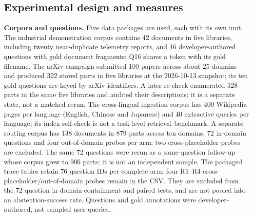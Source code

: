 \documentclass[11pt]{article}
\begin{document}
\subsection{Experimental design and measures}


\textbf{Corpora and questions.} Five data packages are used, each with its own
unit. The industrial demonstration corpus contains 42 documents in five
libraries, including twenty near-duplicate telemetry reports, and 16
developer-authored questions with gold document fragments; Q16 shares a token
with its gold filename. The arXiv campaign submitted 100 papers across about
25 domains and produced 322 stored parts in five libraries at the 2026-10-13
snapshot; its ten gold questions are keyed by arXiv identifiers. A later
re-check enumerated 328 parts in the same five libraries and audited their
descriptions; it is a separate state, not a matched rerun. The cross-lingual
ingestion corpus has 400 Wikipedia pages per language (English, Chinese and
Japanese) and 40 extractive queries per language; its index self-check is not
a task-level retrieval benchmark. A separate routing corpus has 138 documents
in 879 parts across ten domains, 72 in-domain questions and four
out-of-domain probes per arm; two cross-placeholder probes are excluded. The
same 72 questions were rerun as a same-question follow-up whose corpus grew
to 906 parts; it is not an independent sample. The packaged trace tables
retain 76 question IDs per complete arm; four R1--R4
cross-placeholder/out-of-domain probes remain in the CSV. They are excluded
from the 72-question in-domain containment and paired tests, and are not
pooled into an abstention-success rate. Questions and gold annotations were
developer-authored, not sampled user queries.
\end{document}
